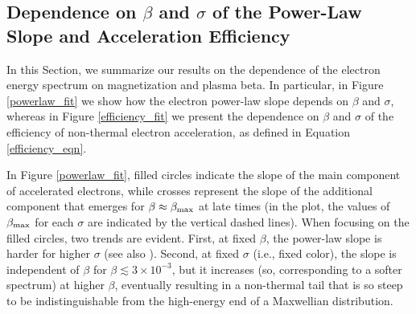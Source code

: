 


\subsection{Dependence on $\beta$  and $\sigma$ of the Power-Law Slope and Acceleration Efficiency}\label{sec:5.4}
In this Section, we summarize our results on the dependence of the electron energy spectrum on magnetization and plasma beta. In particular, in Figure \ref{powerlaw_fit} we show how the electron power-law slope depends on $\beta$ and $\sigma$, whereas in Figure  \ref{efficiency_fit} we present the dependence on $\beta$ and $\sigma$ of the efficiency of non-thermal electron acceleration, as defined in Equation \ref{efficiency_eqn}.  

In Figure \ref{powerlaw_fit}, filled circles indicate the slope of the main component of accelerated electrons, while crosses represent the slope of the additional component that emerges for $\beta\approx \beta_{\rm max}$ at late times (in the plot, the values of $\beta_{\rm max}$ for each $\sigma$ are indicated by the vertical dashed lines). When focusing on the filled circles, two trends are evident. First, at fixed $\beta$, the power-law slope is harder for higher $\sigma$ (see also \citealt{werner2018}). Second, at fixed $\sigma$ (i.e., fixed color), the slope is independent of $\beta$ for $\beta \lesssim 3 \times 10^{-3}$, but it increases (so, corresponding to a softer spectrum) at higher $\beta$, eventually resulting in a non-thermal tail that is so steep to be indistinguishable from the high-energy end of a Maxwellian distribution.

